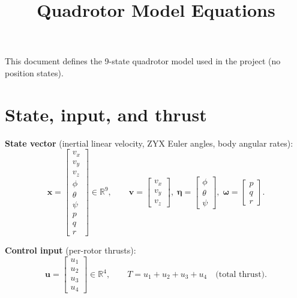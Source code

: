 \documentclass[11pt]{article}
\title{Quadrotor Model Equations}
\author{}
\date{}
\begin{document}
\maketitle
\noindent
This document defines the 9-state quadrotor model used in the project (no position states).

\section*{State, input, and thrust}

\textbf{State vector} (inertial linear velocity, ZYX Euler angles, body angular rates):
\begin{equation}
  \bm{x} =
  \begin{bmatrix}
    v_x \\ v_y \\ v_z \\ \phi \\ \theta \\ \psi \\ p \\ q \\ r
  \end{bmatrix}
  \in \mathbb{R}^9,
  \qquad
  \bm{v} = \begin{bmatrix} v_x \\ v_y \\ v_z \end{bmatrix},\;
  \bm{\eta} = \begin{bmatrix} \phi \\ \theta \\ \psi \end{bmatrix},\;
  \bm{\omega} = \begin{bmatrix} p \\ q \\ r \end{bmatrix}.
\end{equation}

\textbf{Control input} (per-rotor thrusts):
\begin{equation}
  \bm{u} =
  \begin{bmatrix} u_1 \\ u_2 \\ u_3 \\ u_4 \end{bmatrix}
  \in \mathbb{R}^4,
  \qquad
  T = u_1 + u_2 + u_3 + u_4 \quad \text{(total thrust).}
\end{equation}
\end{document}

